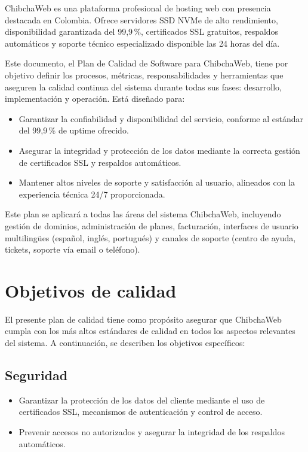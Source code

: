 \documentclass[12pt,a4paper]{article}
\begin{document}
ChibchaWeb es una plataforma profesional de hosting web con presencia destacada en
Colombia. Ofrece servidores SSD NVMe de alto rendimiento, disponibilidad garantizada del
99,9\,\%, certificados SSL gratuitos, respaldos automáticos y soporte técnico especializado
disponible las 24 horas del día.

Este documento, el Plan de Calidad de Software para ChibchaWeb, tiene por objetivo
definir los procesos, métricas, responsabilidades y herramientas que aseguren la calidad
continua del sistema durante todas sus fases: desarrollo, implementación y operación. Está
diseñado para:

\begin{itemize}
  \item Garantizar la confiabilidad y disponibilidad del servicio, conforme al estándar del
        99,9\,\% de uptime ofrecido.
  \item Asegurar la integridad y protección de los datos mediante la correcta gestión de
        certificados SSL y respaldos automáticos.
  \item Mantener altos niveles de soporte y satisfacción al usuario, alineados con la
        experiencia técnica 24/7 proporcionada.
\end{itemize}

Este plan se aplicará a todas las áreas del sistema ChibchaWeb, incluyendo gestión de
dominios, administración de planes, facturación, interfaces de usuario multilingües (español,
inglés, portugués) y canales de soporte (centro de ayuda, tickets, soporte vía email o teléfono).

\section{Objetivos de calidad}

El presente plan de calidad tiene como propósito asegurar que ChibchaWeb cumpla con los
más altos estándares de calidad en todos los aspectos relevantes del sistema. A continuación,
se describen los objetivos específicos:

\subsection{Seguridad}

\begin{itemize}
  \item Garantizar la protección de los datos del cliente mediante el uso de certificados SSL,
        mecanismos de autenticación y control de acceso.
  \item Prevenir accesos no autorizados y asegurar la integridad de los respaldos automáticos.
\end{itemize}
\end{document}
